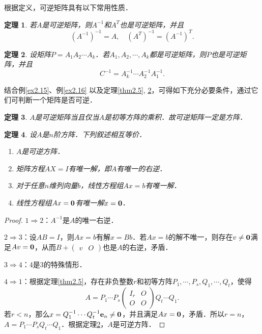 \documentclass[a4paper,fontset=windows]{ctexbook}
\newtheorem{theorem}{定理}[chapter]
\theoremstyle{definition}
\begin{document}
根据定义，可逆矩阵具有以下常用性质．

\begin{theorem}\label{thm2.6}
若$A$是可逆矩阵，则$A^{-1}$和$A^T$也是可逆矩阵，并且
$$(A^{-1})^{-1}=A,\quad(A^T)^{-1}=(A^{-1})^T.$$
\end{theorem}

\begin{theorem}\label{thm2.7}
设矩阵$P=A_1A_2\cdots A_k$．若$A_1,A_2,\cdots,A_k$都是可逆矩阵，则$P$也是可逆矩阵，并且
$$C^{-1}=A_k^{-1}\cdots A_2^{-1}A_1^{-1}.$$
\end{theorem}

结合例\ref{ex2.15}、例\ref{ex2.16} 以及定理\ref{thm2.5}, \ref{thm2.7}，可得如下充分必要条件，通过它们可判断一个矩阵是否可逆．

\begin{theorem}\label{thm2.8}
$A$是可逆矩阵当且仅当$A$是初等方阵的乘积．故可逆矩阵一定是方阵．
\end{theorem}

\begin{theorem}\label{thm2.9}
设$A$是$n$阶方阵．下列叙述相互等价．
\begin{enumerate}
\item $A$是可逆方阵．
\item 矩阵方程$AX=I$有唯一解，即$A$有唯一的右逆．
\item 对于任意$n$维列向量$b$，线性方程组$Ax=b$有唯一解．
\item 线性方程组$Ax={\bf 0}$有唯一解$x={\bf 0}$．
\end{enumerate}
\end{theorem}

\begin{proof}
$1\Rightarrow 2$：$A^{-1}$是$A$的唯一右逆．

$2\Rightarrow 3$：设$AB=I$，则$Ax=b$有解$x=Bb$．若$Ax=b$的解不唯一，则存在$v\ne{\bf 0}$满足$Av={\bf 0}$，从而$B+\begin{pmatrix}v&O\end{pmatrix}$也是$A$的右逆，矛盾．

$3\Rightarrow 4$：4是3的特殊情形．

$4\Rightarrow 1$：根据定理\ref{thm2.5}，存在非负整数$r$和初等方阵$P_1,\cdots,P_s,Q_1,\cdots,Q_t$，使得
$$A=P_1\cdots P_s\begin{pmatrix}I_r&O \\ O&O\end{pmatrix}Q_t\cdots Q_1.$$
若$r<n$，那么$x=Q_1^{-1}\cdots Q_t^{-1}{\bf e}_n\ne{\bf 0}$，并且满足$Ax={\bf 0}$，矛盾．所以$r=n$，$A=P_1\cdots P_sQ_t\cdots Q_1$．根据定理\ref{thm2.7}，$A$是可逆方阵．
\end{proof}
\end{document}
